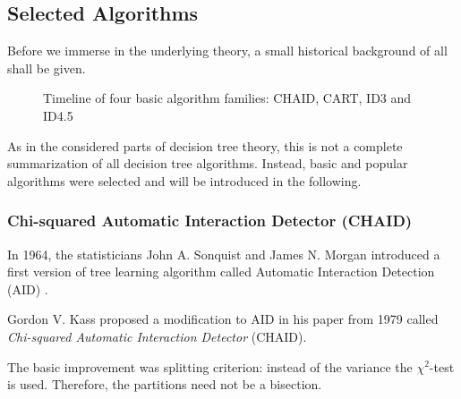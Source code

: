 \subsection{Selected Algorithms}\label{selectedalgorithms}

Before we immerse in the underlying theory, a small historical background of all shall be given. 

\begin{figure}[!h]
\caption{Timeline of four basic algorithm families: \textsf{CHAID}, CART, ID3 and ID4.5}
\label{}
\end{figure}


\begin{remark}
    As in the considered parts of decision tree theory, this is not a complete summarization of all decision tree algorithms. Instead, basic and popular algorithms were selected and will be introduced in the following. 
\end{remark}




\subsubsection{Chi-squared Automatic Interaction Detector (CHAID)} 

In 1964, the statisticians John A. Sonquist and James N. Morgan introduced a first version of tree learning algorithm called Automatic Interaction Detection (AID) \cite{morgan1963problems}. 

Gordon V. Kass proposed a modification to AID in his paper from 1979 \cite{kass1980exploratory} called \textit{Chi-squared Automatic Interaction Detector} (CHAID). 

The basic improvement was splitting criterion: instead of the variance the $\chi^2$-test is used. Therefore, the partitions need not be a bisection.

